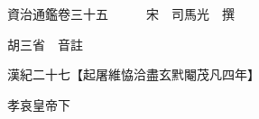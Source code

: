 










 


 
 


 

  
  
  
  
  





  
  
  
  
  
 
  

  

  
  
  



  

 
 

  
   




  

  
  


  　　資治通鑑卷三十五　　　宋　司馬光　撰

　　胡三省　音註

　　漢紀二十七【起屠維恊洽盡玄黓閹茂凡四年】

　　孝哀皇帝下

